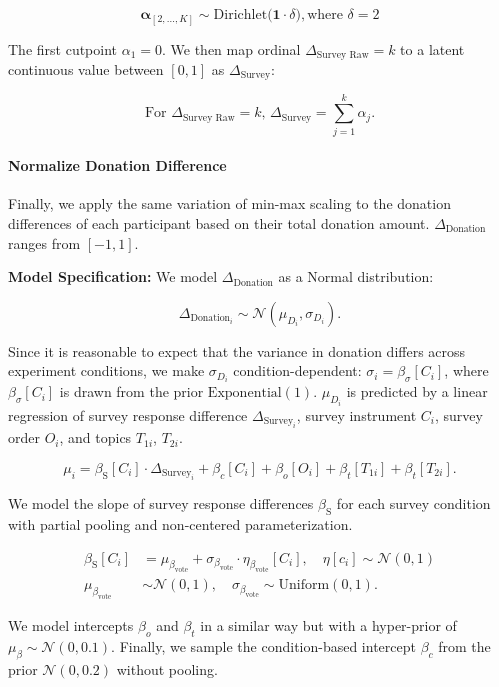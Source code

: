 \begin{equation}
    \boldsymbol{\alpha}_{[2, ...,K]} \sim \mathrm{Dirichlet}\bigl(\mathbf{1}\cdot \delta\bigr), \text{where } \delta = 2
\end{equation}

The first cutpoint $\alpha_{1} = 0$. We then map ordinal $\Delta_{\text{Survey Raw}}=k$ to a latent continuous value between $[0,1]$ as $\Delta_{\text{Survey}}$:

\begin{equation}
    \text{For }\Delta_{\text{Survey Raw}}=k\text{, } \Delta_{\text{Survey}} = \sum_{j=1}^{k} \alpha_j.
\end{equation}

\paragraph{Normalize Donation Difference} Finally, we apply the same variation of min-max scaling to the donation differences of each participant based on their total donation amount. $\Delta_{\text{Donation}}$ ranges from $[-1, 1]$.

\textbf{Model Specification:} We model $\Delta_{\text{Donation}}$ as a Normal distribution:

\begin{equation}
    \label{eq:intensity_normal}
    \Delta_{\text{Donation}_i} \sim \mathcal{N}(\mu_{D_i}, \sigma_{D_i}).
\end{equation}

Since it is reasonable to expect that the variance in donation differs across experiment conditions, we make 
$\sigma_{D_i}$ condition-dependent: $\sigma_i=\beta_{\sigma}[C_i]$, where $\beta_{\sigma}[C_i]$ is drawn from the prior $\mathrm{Exponential}(1)$. $\mu_{D_i}$ is predicted by a linear regression of survey response difference $\Delta_{\text{Survey}_i}$, survey instrument $C_i$, survey order $O_i$, and topics $T_{1i}$, $T_{2i}$. 

\begin{equation}
    \label{eq:intensity_linpred}
    \mu_i
    =
    \beta_{\text{S}}[C_i] \cdot \Delta_{\text{Survey}_i}
    +
    \beta_{c}[C_i]
    +
    \beta_{o}[O_i]
    +
    \beta_{t}[T_{1i}]
    +
    \beta_{t}[T_{2i}].
\end{equation}

We model the slope of survey response differences $\beta_{\text{S}}$ for each survey condition with partial pooling and non-centered parameterization.

\begin{align}
    \beta_{\text{S}}[C_i]
    &=
    \mu_{\beta_{\text{vote}}}
    + \sigma_{\beta_{\text{vote}}} \cdot \eta_{\beta_{\text{vote}}}[C_i],
    \quad \eta[c_i] \sim \mathcal{N}(0, 1) \\
    \mu_{\beta_{\text{vote}}}
    &\sim
    \mathcal{N}(0,1),
    \quad
    \sigma_{\beta_{\text{vote}}}
    \sim
    \mathrm{Uniform}(0,1).
\end{align}

We model intercepts $\beta_{o}$ and $\beta_{t}$ in a similar way but with a hyper-prior of $\mu_{\beta} \sim \mathcal{N}(0,0.1)$. Finally, we sample the condition-based intercept $\beta_{c}$ from the prior $\mathcal{N}(0,0.2)$ without pooling. 
